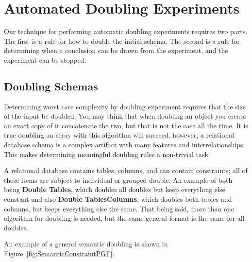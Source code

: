 \section{Automated Doubling Experiments}
  \label{sec:technique}

  Our technique for performing automatic doubling experiments requires
  two parts.  The first is a rule for how to double the initial schema.
  The second is a rule for determining when a conclusion can be drawn
  from the experiment, and the experiment can be stopped. 

  \subsection{Doubling Schemas}
  \label{subsec:doubling}

  Determining worst case complexity by doubling experiment requires that
  the size of the input be doubled. You may think that when doubling an
  object you create an exact copy of it concatenate the two, but that
  is not the case all the time. It is true doubling an array
  with this algorithm will succeed, however, a relational database
  schema is a complex artifact with many features and interrelationships. 
  This makes determining meaningful doubling rules a non-trivial task.

  A relational database contains tables, columns, and can contain constraints; 
  all of these items are subject to individual or grouped double. An example of
  both being \textbf{Double Tables}, which doubles all doubles but keep
  everything else constant and also \textbf{Double TablesColumns}, which
  doubles both tables and columns, but keeps everything else the same. That 
  being said, more than one algorithm for doubling is needed, but the same 
  general format is the same for all doubles.

  An example of a general semantic doubling is shown in
  Figure~\ref{fig:SemanticConstraintPGF}.


